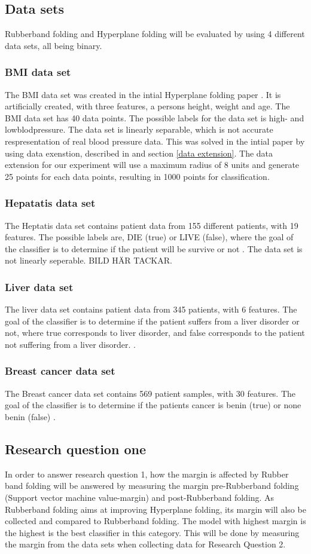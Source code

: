 \documentclass[a4paper,twoside]{bth}
\begin{document}
\subsection{Data sets}
Rubberband folding and Hyperplane folding will be evaluated by using 4 different data sets, all being binary. 
\subsubsection{BMI data set}
The BMI data set was created in the intial Hyperplane folding paper \cite{unpublished}. It is artificially created, with three features, a persons height, weight and age. The BMI data set has 40 data points. The possible labels for the data set is high- and lowblodpressure. The data set is linearly separable, which is not accurate respresentation of real blood pressure data. This was solved in the intial paper by using data exenstion, described in \cite{unpublished} and section \ref{data extension}. The data extension for our experiment will use a maximum radius of 8 units and generate 25 points for each data points, resulting in 1000 points for classification. 
\subsubsection{Hepatatis data set}
The Heptatis data set contains patient data from 155 different patients, with 19 features. The possible labels are, DIE (true) or LIVE (false), where the goal of the classifier is to determine if the patient will be survive or not \cite{Dua:2019}. The data set is not linearly seperable. BILD HÄR TACKAR.
\subsubsection{Liver data set}
The liver data set contains patient data from 345 patients, with 6 features. The goal of the classifier is to determine if the patient suffers from a liver disorder or not, where true corresponds to liver disorder, and false corresponds to the patient not suffering from a liver disorder. \cite{Dua:2019}. 
\subsubsection{Breast cancer data set}
The Breast cancer data set contains 569 patient samples, with 30 features. The goal of the classifier is to determine if the patients cancer is benin (true) or none benin (false) \cite{breastcancer}.


\subsection{Research question  one}
In order to answer research question 1, how the margin is affected by Rubber band folding will be answered by measuring the margin pre-Rubberband folding (Support vector machine value-margin) and post-Rubberband folding. As Rubberband folding aims at improving Hyperplane folding, its margin will also be collected and compared to Rubberband folding. The model with highest margin is the highest is the best classifier in this category. This will be done by measuring the margin from the data sets when collecting data for Research Question 2.
\end{document}
